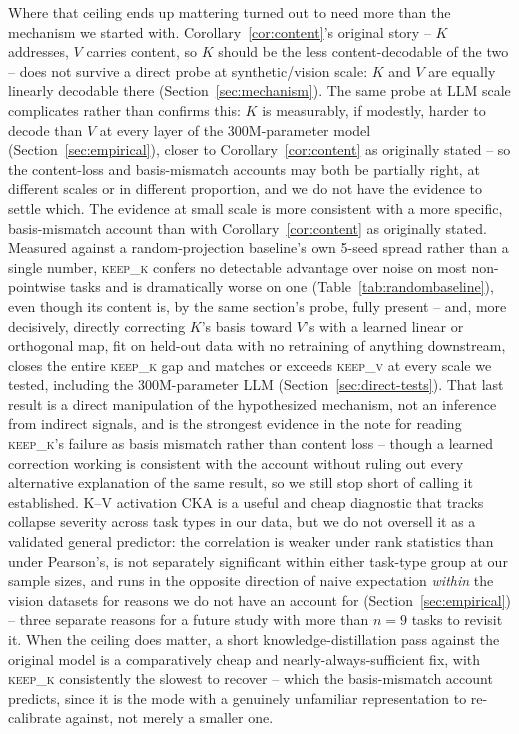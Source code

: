 \documentclass[11pt]{article}
\begin{document}
Where that ceiling ends up mattering turned out to need more than the mechanism we
started with. Corollary~\ref{cor:content}'s original story -- $K$ addresses, $V$
carries content, so $K$ should be the less content-decodable of the two -- does not
survive a direct probe at synthetic/vision scale: $K$ and $V$ are equally linearly
decodable there (Section~\ref{sec:mechanism}). The same probe at LLM scale complicates
rather than confirms this: $K$ is measurably, if modestly, harder to decode than $V$
at every layer of the 300M-parameter model (Section~\ref{sec:empirical}), closer to
Corollary~\ref{cor:content} as originally stated -- so the content-loss and
basis-mismatch accounts may both be partially right, at different scales or in
different proportion, and we do not have the evidence to settle which. The evidence
at small scale is more consistent with a more specific, basis-mismatch account than
with Corollary~\ref{cor:content} as originally stated. Measured against a
random-projection baseline's own 5-seed spread rather than a single number,
\textsc{keep\_k} confers no detectable advantage over noise on most non-pointwise
tasks and is dramatically worse on one (Table~\ref{tab:randombaseline}), even though
its content is, by the same section's probe, fully present -- and, more decisively,
directly correcting $K$'s basis toward $V$'s with a learned linear or orthogonal map,
fit on held-out data with no retraining of anything downstream, closes the entire
\textsc{keep\_k} gap and matches or exceeds \textsc{keep\_v} at every scale we tested,
including the 300M-parameter LLM (Section~\ref{sec:direct-tests}). That last result is
a direct manipulation of the hypothesized mechanism, not an inference from indirect
signals, and is the strongest evidence in the note for reading \textsc{keep\_k}'s
failure as basis mismatch rather than content loss -- though a learned correction
working is consistent with the account without ruling out every alternative
explanation of the same result, so we still stop short of calling it established.
K--V activation
CKA is a useful and cheap diagnostic that tracks collapse severity across task types
in our data, but we do not oversell it as a validated general predictor: the
correlation is weaker under rank statistics than under Pearson's, is not separately
significant within either task-type group at our sample sizes, and runs in the
opposite direction of naive expectation \emph{within} the vision datasets for reasons
we do not have an account for (Section~\ref{sec:empirical}) -- three separate reasons
for a future study with more than $n=9$ tasks to revisit it. When the ceiling does
matter, a short knowledge-distillation pass against the original model is a
comparatively cheap and nearly-always-sufficient fix, with \textsc{keep\_k}
consistently the slowest to recover -- which the basis-mismatch account predicts,
since it is the mode with a genuinely unfamiliar representation to re-calibrate
against, not merely a smaller one.
\end{document}
